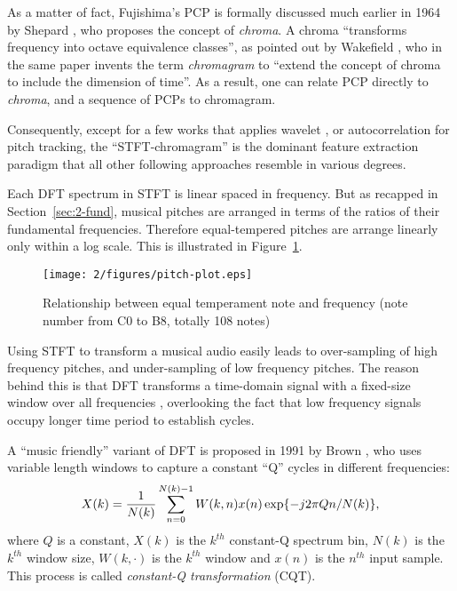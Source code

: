 As a matter of fact, Fujishima's PCP is formally discussed much earlier in 1964 by Shepard \cite{shepard1964circularity}, who proposes the concept of {\it chroma}. A chroma ``transforms frequency into octave equivalence classes'', as pointed out by Wakefield \cite{wakefield1999mathematical}, who in the same paper invents the term {\it chromagram} to ``extend the concept of chroma to include the dimension of time''. As a result, one can relate PCP directly to {\it chroma}, and a sequence of PCPs to chromagram.

Consequently, except for a few works that applies wavelet \cite{su2001multi}, or autocorrelation \cite{bello2000techniques,zenz2007automatic} for pitch tracking, the ``STFT-chromagram'' is the dominant feature extraction paradigm that all other following approaches resemble in various degrees.

Each DFT spectrum in STFT is linear spaced in frequency. But as recapped in Section~\ref{sec:2-fund}, musical pitches are arranged in terms of the ratios of their fundamental frequencies. Therefore equal-tempered pitches are arrange linearly only within a log scale. This is illustrated in Figure~\ref{fig:2-pitchplot}.
\begin{figure}[htb]
\centering
\texttt{[image: 2/figures/pitch-plot.eps]}
\caption{Relationship between equal temperament note and frequency (note number from C0 to B8, totally 108 notes)}
\label{fig:2-pitchplot}
\end{figure}
Using STFT to transform a musical audio easily leads to over-sampling of high frequency pitches, and under-sampling of low frequency pitches. The reason behind this is that DFT transforms a time-domain signal with a fixed-size window over all frequencies \cite{oppenheim1983signals}, overlooking the fact that low frequency signals occupy longer time period to establish cycles.

A ``music friendly'' variant of DFT is proposed in 1991 by Brown \cite{brown1991calculation}, who uses variable length windows to capture a constant ``Q'' cycles in different frequencies:
\begin{equation}
X(k) = {1\over {N(k)}} \sum_{n=0}^{N(k)-1}{W(k,n)x(n)\exp\{-j2\pi Qn/N(k)\}},
\end{equation}
where $Q$ is a constant, $X(k)$ is the $k^{th}$ constant-Q spectrum bin, $N(k)$ is the $k^{th}$ window size, $W(k,\cdot)$ is the $k^{th}$ window and $x(n)$ is the $n^{th}$ input sample. This process is called \textit{constant-Q transformation} (CQT).

